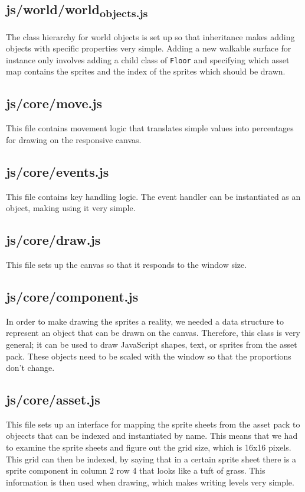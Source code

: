 \documentclass[11pt]{article}
\begin{document}
\subsection{js/world/world\textsubscript{objects.js}}
\label{sec:orgc41837a}
The class hierarchy for world objects is set up so that inheritance makes adding objects with specific properties very simple. Adding a new walkable surface for instance only involves adding a child class of \texttt{Floor} and specifying which asset map contains the sprites and the index of the sprites which should be drawn.\\
\subsection{js/core/move.js}
\label{sec:org51300f8}
This file contains movement logic that translates simple values into percentages for drawing on the responsive canvas.\\
\subsection{js/core/events.js}
\label{sec:org61fec1c}
This file contains key handling logic. The event handler can be instantiated as an object, making using it very simple.\\
\subsection{js/core/draw.js}
\label{sec:org5f08fd7}
This file sets up the canvas so that it responds to the window size.\\
\subsection{js/core/component.js}
\label{sec:orgb273ab4}
In order to make drawing the sprites a reality, we needed a data structure to represent an object that can be drawn on the canvas. Therefore, this class is very general; it can be used to draw JavaScript shapes, text, or sprites from the asset pack. These objects need to be scaled with the window so that the proportions don't change.\\
\subsection{js/core/asset.js}
\label{sec:orga894e8e}
This file sets up an interface for mapping the sprite sheets from the asset pack to objeccts that can be indexed and instantiated by name. This means that we had to examine the sprite sheets and figure out the grid size, which is 16x16 pixels. This grid can then be indexed, by saying that in a certain sprite sheet there is a sprite component in column 2 row 4 that looks like a tuft of grass. This information is then used when drawing, which makes writing levels very simple.\\
\end{document}
